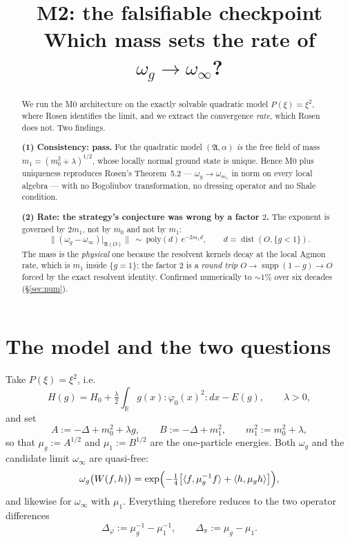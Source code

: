 \documentclass[11pt,a4paper]{article}
\title{M2: the falsifiable checkpoint\\[2pt]
\large Which mass sets the rate of $\omega_g\to\omega_\infty$?}
\author{}
\date{}
\theoremstyle{plain}
\theoremstyle{definition}
\newcommand{\A}{\mathfrak{A}}
\newcommand{\R}{\mathbb{R}}
\newcommand{\ip}[2]{\langle #1,#2\rangle}
\DeclareMathOperator{\dist}{dist}
\DeclareMathOperator{\supp}{supp}
\begin{document}
\maketitle

\begin{abstract}
We run the M0 architecture on the exactly solvable quadratic model $P(\xi)=\xi^2$, where Rosen
\cite{Rosen72} identifies the limit, and we extract the convergence \emph{rate}, which Rosen does
not. Two findings.

\smallskip
\noindent\textbf{(1) Consistency: pass.} For the quadratic model $(\A,\alpha)$ \emph{is} the free
field of mass $m_1=(m_0^2+\lambda)^{1/2}$, whose locally normal ground state is unique. Hence M0
plus uniqueness reproduces Rosen's Theorem~5.2 --- $\omega_g\to\omega_{m_1}$ in norm on every
local algebra --- with no Bogoliubov transformation, no dressing operator and no Shale condition.

\smallskip
\noindent\textbf{(2) Rate: the strategy's conjecture was wrong by a factor $2$.} The exponent is
governed by $2m_1$, not by $m_0$ and not by $m_1$:
\[
  \bigl\|(\omega_g-\omega_\infty)|_{\A(O)}\bigr\|\ \sim\ \mathrm{poly}(d)\,e^{-2m_1 d},
  \qquad d=\dist(O,\{g<1\}).
\]
The mass is the \emph{physical} one because the resolvent kernels decay at the local Agmon rate,
which is $m_1$ inside $\{g=1\}$; the factor $2$ is a \emph{round trip} $O\to\supp(1-g)\to O$
forced by the exact resolvent identity. Confirmed numerically to $\sim1\%$ over six decades
(\S\ref{sec:num}).
\end{abstract}

\section{The model and the two questions}

Take $P(\xi)=\xi^2$, i.e.
\[
  H(g)=H_0+\tfrac{\lambda}{2}\int_\R g(x):\!\varphi_0(x)^2\!:dx-E(g),\qquad \lambda>0,
\]
and set
\[
  A:=-\Delta+m_0^2+\lambda g,\qquad B:=-\Delta+m_1^2,\qquad m_1^2:=m_0^2+\lambda ,
\]
so that $\mu_g:=A^{1/2}$ and $\mu_1:=B^{1/2}$ are the one-particle energies. Both $\omega_g$ and
the candidate limit $\omega_\infty$ are quasi-free:
\begin{equation}\label{eq:qf}
  \omega_g\bigl(W(f,h)\bigr)=\exp\Bigl(-\tfrac14\bigl[\ip{f}{\mu_g^{-1}f}+\ip{h}{\mu_g h}\bigr]\Bigr),
\end{equation}
and likewise for $\omega_\infty$ with $\mu_1$. Everything therefore reduces to the two operator
differences
\begin{equation}\label{eq:Deltas}
  \Delta_\varphi:=\mu_g^{-1}-\mu_1^{-1},\qquad
  \Delta_\pi:=\mu_g-\mu_1 .
\end{equation}
\end{document}
